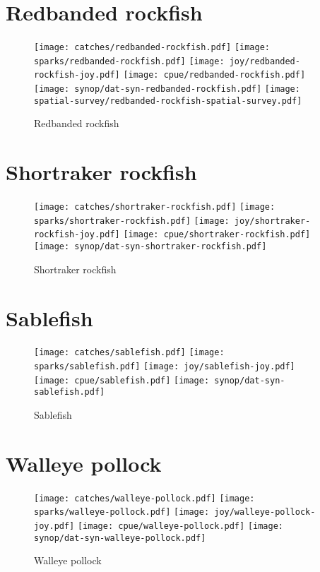 \section*{Redbanded rockfish}

\begin{figure}[htbp]
\centering
\texttt{[image: catches/redbanded-rockfish.pdf]}
\texttt{[image: sparks/redbanded-rockfish.pdf]}
\texttt{[image: joy/redbanded-rockfish-joy.pdf]}
\texttt{[image: cpue/redbanded-rockfish.pdf]}
\texttt{[image: synop/dat-syn-redbanded-rockfish.pdf]}
\texttt{[image: spatial-survey/redbanded-rockfish-spatial-survey.pdf]}
\caption{Redbanded rockfish}
\end{figure}
\clearpage
\section*{Shortraker rockfish}

\begin{figure}[htbp]
\centering
\texttt{[image: catches/shortraker-rockfish.pdf]}
\texttt{[image: sparks/shortraker-rockfish.pdf]}
\texttt{[image: joy/shortraker-rockfish-joy.pdf]}
\texttt{[image: cpue/shortraker-rockfish.pdf]}
\texttt{[image: synop/dat-syn-shortraker-rockfish.pdf]}
\caption{Shortraker rockfish}
\end{figure}
\clearpage
\section*{Sablefish}

\begin{figure}[htbp]
\centering
\texttt{[image: catches/sablefish.pdf]}
\texttt{[image: sparks/sablefish.pdf]}
\texttt{[image: joy/sablefish-joy.pdf]}
\texttt{[image: cpue/sablefish.pdf]}
\texttt{[image: synop/dat-syn-sablefish.pdf]}
\caption{Sablefish}
\end{figure}
\clearpage
\section*{Walleye pollock}

\begin{figure}[htbp]
\centering
\texttt{[image: catches/walleye-pollock.pdf]}
\texttt{[image: sparks/walleye-pollock.pdf]}
\texttt{[image: joy/walleye-pollock-joy.pdf]}
\texttt{[image: cpue/walleye-pollock.pdf]}
\texttt{[image: synop/dat-syn-walleye-pollock.pdf]}
\caption{Walleye pollock}
\end{figure}
\clearpage
